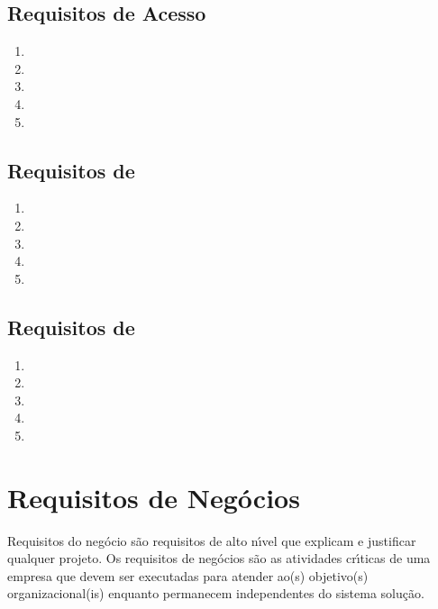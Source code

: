            \subsection{Requisitos de Acesso }
            \begin{enumerate}
             \item
             \item
             \item
             \item
             \item
           \end{enumerate}


           \subsection{Requisitos de}
            \begin{enumerate}
             \item
             \item
             \item
             \item
             \item
           \end{enumerate}


           \subsection{Requisitos de  }
            \begin{enumerate}
             \item
             \item
             \item
             \item
             \item
           \end{enumerate}



     \section{Requisitos de Neg\'{o}cios}
     Requisitos do neg\'{o}cio s\~{a}o requisitos de alto n\'{\i}vel que explicam e justificar qualquer projeto. Os requisitos de neg\'{o}cios s\~{a}o as atividades cr\'{\i}ticas de uma empresa que devem ser executadas para atender ao(s) objetivo(s) organizacional(is) enquanto permanecem independentes do sistema solu\c{c}\~{a}o.

